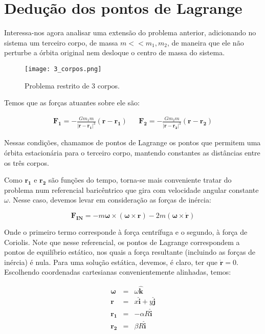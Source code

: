 \section{Dedução dos pontos de Lagrange}

Interessa-nos agora analisar uma extensão do problema anterior, adicionando no sistema um terceiro corpo, de massa $m<<m_1,m_2$, de maneira que ele não perturbe a órbita original nem desloque o centro de massa do sistema. 

\begin{figure}[!h]
\centering
\texttt{[image: 3\_corpos.png]}
\caption{Problema restrito de 3 corpos.}
\end{figure}


Temos que as forças atuantes sobre ele são:

\begin{align}
\mathbf{F_1} = -\frac{Gm_1m}{|\mathbf{r}-\mathbf{r_1}|^3}(\mathbf{r}-\mathbf{r_1}) && \mathbf{F_2} = -\frac{Gm_2m}{|\mathbf{r}-\mathbf{r_2}|^3}(\mathbf{r}-\mathbf{r_2})
\end{align}

Nessas condições, chamamos de pontos de Lagrange os pontos que permitem uma órbita estacionária para o terceiro corpo, mantendo constantes as distâncias entre os três corpos.

Como $\mathbf{r_1}$ e $\mathbf{r_2}$ são funções do tempo, torna-se mais conveniente tratar do problema num referencial baricêntrico que gira com velocidade angular constante $\omega$. Nesse caso, devemos levar em consideração as forças de inércia:

\begin{equation}
\mathbf{F_{IN}} = -m\mathbf{\omega} \times (\mathbf{\omega} \times \mathbf{r}) -2m(\mathbf{\omega} \times \mathbf{\dot{r}}) 
\end{equation}

Onde o primeiro termo corresponde à força centrífuga e o segundo, à força de Coriolis. Note que nesse referencial, os pontos de Lagrange correspondem a pontos de equilíbrio estático, nos quais a força resultante (incluindo as forças de inércia) é nula. Para uma solução estática, devemos, é claro, ter que $\mathbf{\dot{r}}=0$. Escolhendo coordenadas cartesianas convenientemente alinhadas, temos:

\begin{eqnarray}
\boldsymbol{\omega} & = & \omega\mathbf{\hat{k}} \\
\mathbf{r} \; & = & x\mathbf{\hat{i}} + y\mathbf{\hat{j}} \\
\mathbf{r_1} & = & -\alpha R\mathbf{\hat{i}} \\
\mathbf{r_2} & = & \beta R\mathbf{\hat{i}} \\
\end{eqnarray}

